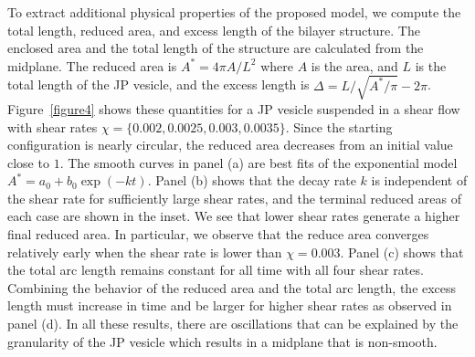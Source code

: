 \documentclass[lineno]{jfm}
\begin{document}
To extract additional physical properties of the proposed model, we
compute the total length, reduced area, and excess length of the bilayer
structure. The enclosed area and the total length of the structure are
calculated from the midplane. The reduced area is $A^* = 4\pi A/L^2$
where $A$ is the area, and $L$ is the total length of the JP vesicle,
and the excess length is $\Delta=L/\sqrt{A^*/\pi}-2\pi$.
Figure~\ref{figure4} shows these quantities for a JP vesicle suspended
in a shear flow with shear rates $\chi=\{0.002,0.0025,0.003,0.0035\}$.
Since the starting configuration is nearly circular, the reduced area
decreases from an initial value close to $1$. The smooth curves in panel
(a) are best fits of the exponential model $A^* = a_0 + b_0 \exp(-kt)$.
Panel (b) shows that the decay rate $k$ is independent of the shear rate
for sufficiently large shear rates, and the terminal reduced areas of
each case are shown in the inset. We see that lower shear rates generate
a higher final reduced area. In particular, we observe that the reduce
area converges relatively early when the shear rate is lower than
$\chi=0.003$. 
Panel (c) shows that the total arc length remains constant for all time
with all four shear rates. Combining the behavior of the reduced area
and the total arc length, the excess length must increase in time and be
larger for higher shear rates as observed in panel (d). In all these
results, there are oscillations that can be explained by the granularity
of the JP vesicle which results in a midplane that is non-smooth.
\end{document}
